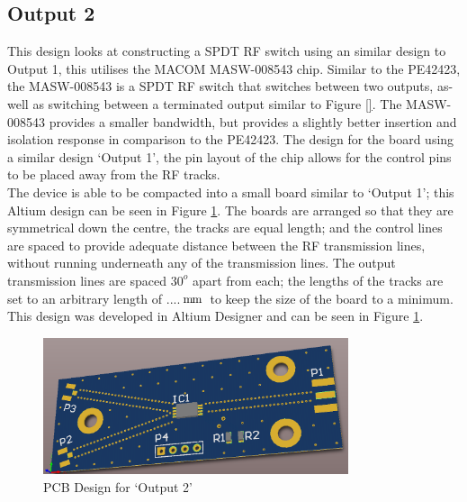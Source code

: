 \documentclass[12pt,openany,a4paper]{book}
\newcommand{\pack}	{\hspace{-0.08em}}
\newcommand{\mm}	{\ensuremath{\rm\,m\pack m}}
\begin{document}
\subsection{Output 2}		\label{sec:output2}
This design looks at constructing a SPDT RF switch using an similar design to Output 1, this utilises the MACOM MASW-008543
chip. Similar to the PE42423, the MASW-008543 is a SPDT RF switch that switches between two outputs, as-well as switching between a terminated output similar to Figure \ref{}. The MASW-008543 provides a smaller bandwidth, but provides a slightly better insertion and isolation response in comparison to the PE42423. The design for the board using a similar design `Output 1', the pin layout of the chip allows for the control pins to be placed away from the RF tracks.\\[0.2cm]
The device is able to be compacted into a small board similar to `Output 1'; this Altium design can be seen in Figure \ref{fig:output2}. The boards are arranged so that they are symmetrical down the centre, the tracks are equal length; and the control lines are spaced to provide adequate distance between the RF transmission lines, without running underneath any of the transmission lines. The output transmission lines are spaced $30^o$ apart from each; the lengths of the tracks are set to an arbitrary length of ....\mm \ to keep the size of the board to a minimum.\\[0.2cm]
This design was developed in Altium Designer and can be seen in Figure \ref{fig:output2}.
\begin{figure}[H]
	\centering
    \includegraphics[width=0.8\textwidth]{output2_pcb.png}
	\caption{PCB Design for `Output 2'}
	\label{fig:output2}
\end{figure} 
\end{document}
